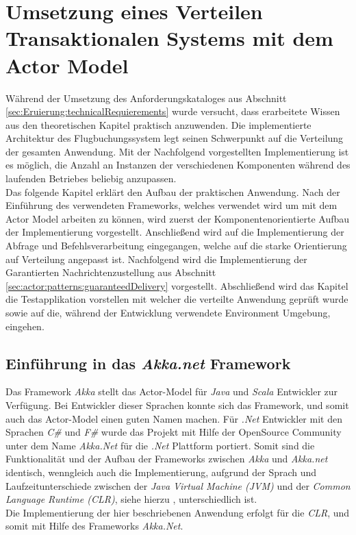 \chapter{Umsetzung eines Verteilen Transaktionalen Systems mit dem Actor Model} 
\label{cha:practicalDevelopment}

Während der Umsetzung des Anforderungskataloges aus Abschnitt \ref{sec:Eruierung:technicalRequierements} wurde versucht, dass erarbeitete Wissen aus den theoretischen Kapitel praktisch anzuwenden. Die implementierte Architektur des Flugbuchungssystem legt seinen Schwerpunkt auf die Verteilung der gesamten Anwendung. Mit der Nachfolgend vorgestellten Implementierung ist es möglich, die Anzahl an Instanzen der verschiedenen Komponenten während des laufenden Betriebes beliebig anzupassen. \\
Das folgende Kapitel erklärt den Aufbau der praktischen Anwendung. Nach der Einführung des verwendeten Frameworks, welches verwendet wird um mit dem Actor Model arbeiten zu können, wird zuerst der Komponentenorientierte Aufbau der Implementierung vorgestellt. Anschließend wird auf die Implementierung der Abfrage und Befehlsverarbeitung eingegangen, welche auf die starke Orientierung auf Verteilung angepasst ist. Nachfolgend wird die Implementierung der Garantierten Nachrichtenzustellung aus Abschnitt \ref{sec:actor:patterns:guaranteedDelivery} vorgestellt. Abschließend wird das Kapitel die Testapplikation vorstellen mit welcher die verteilte Anwendung geprüft wurde sowie auf die, während der Entwicklung verwendete Environment Umgebung, eingehen.

\section{Einführung in das \textit{Akka.net} Framework}
Das Framework \textit{Akka} stellt das Actor-Model für \textit{Java} und \textit{Scala} Entwickler zur Verfügung. Bei Entwickler dieser Sprachen konnte sich das Framework, und somit auch das Actor-Model einen guten Namen machen. Für \textit{.Net} Entwickler mit den Sprachen \textit{C\#} und \textit{F\#} wurde das Projekt mit Hilfe der OpenSource Community unter dem Name \textit{Akka.Net} für die \textit{.Net} Plattform portiert. Somit sind die Funktionalität und der Aufbau der Frameworks zwischen \textit{Akka} und \textit{Akka.net} identisch, wenngleich auch die Implementierung, aufgrund der Sprach und Laufzeitunterschiede zwischen der \textit{Java Virtual Machine (JVM)} und der \textit{Common Language Runtime (CLR)}, siehe hierzu \cite{JvmVsClrsinger2003jvm}, unterschiedlich ist. \\
Die Implementierung der hier beschriebenen Anwendung erfolgt für die \textit{CLR}, und somit mit Hilfe des Frameworks \textit{Akka.Net}. 

